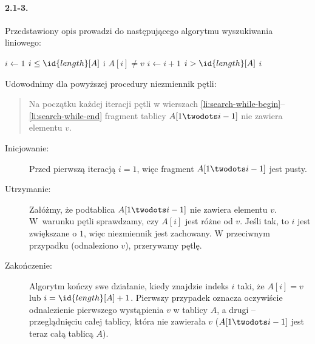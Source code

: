 \paragraph{2.1-3.}
Przedstawiony opis prowadzi do następującego algorytmu wyszukiwania liniowego:
\begin{codebox}
\li $i\gets 1$
\li \While $i\le \id{length}[A]$ i $A[i]\ne v$ \label{li:search-while-begin}
\li     \Do
            $i\gets i+1$
        \End \label{li:search-while-end}
\li \If $i>\id{length}[A]$
\li     \Then
            \Return {}
\li     \Else
            \Return $i$
        \End
\end{codebox}
Udowodnimy dla powyższej procedury niezmiennik pętli:
\begin{quote}
Na początku każdej iteracji pętli  w wierszach \ref{li:search-while-begin}--\ref{li:search-while-end} fragment tablicy $A[1\twodots i-1]$ nie zawiera elementu $v$.
\end{quote}
\begin{description}
  \item[Inicjowanie:] Przed pierwszą iteracją $i=1$, więc fragment $A[1\twodots i-1]$ jest pusty.
  \item[Utrzymanie:] Załóżmy, że podtablica $A[1\twodots i-1]$ nie zawiera elementu $v$. W~warunku pętli  sprawdzamy, czy $A[i]$ jest różne od $v$. Jeśli tak, to $i$ jest zwiększane o $1$, więc niezmiennik jest zachowany. W przeciwnym przypadku (odnaleziono $v$), przerywamy pętlę.
  \item[Zakończenie:] Algorytm kończy swe działanie, kiedy znajdzie indeks $i$ taki, że $A[i]=v$ lub $i=\id{length}[A]+1$. Pierwszy przypadek oznacza oczywiście odnalezienie pierwszego wystąpienia $v$ w tablicy $A$, a drugi -- przeglądnięciu całej tablicy, która nie zawierała $v$ ($A[1\twodots i-1]$ jest teraz całą tablicą $A$).
\end{description}


